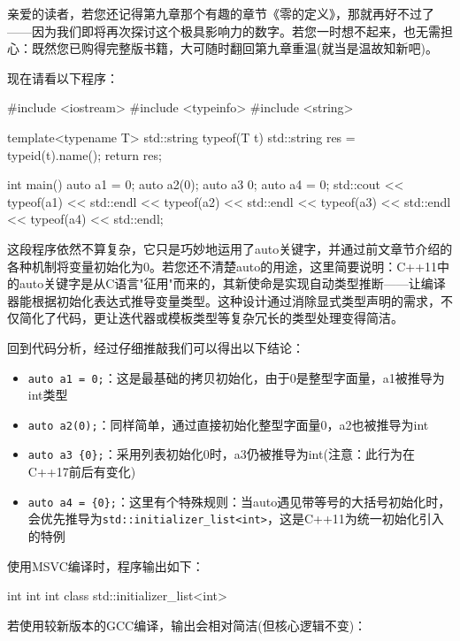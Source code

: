 
亲爱的读者，若您还记得第九章那个有趣的章节《零的定义》，那就再好不过了——因为我们即将再次探讨这个极具影响力的数字。若您一时想不起来，也无需担心：既然您已购得完整版书籍，大可随时翻回第九章重温(就当是温故知新吧)。

现在请看以下程序：

\begin{cpp}
#include <iostream>
#include <typeinfo>
#include <string>

template<typename T> std::string typeof(T t) {
  std::string res = typeid(t).name();
  return res;
}

int main() {
  auto a1 = 0;
  auto a2(0);
  auto a3 {0};
  auto a4 = {0};
  std::cout << typeof(a1) << std::endl
            << typeof(a2) << std::endl
            << typeof(a3) << std::endl
            << typeof(a4) << std::endl;
}
\end{cpp}

这段程序依然不算复杂，它只是巧妙地运用了auto关键字，并通过前文章节介绍的各种机制将变量初始化为0。若您还不清楚auto的用途，这里简要说明：C++11中的auto关键字是从C语言"征用"而来的，其新使命是实现自动类型推断——让编译器能根据初始化表达式推导变量类型。这种设计通过消除显式类型声明的需求，不仅简化了代码，更让迭代器或模板类型等复杂冗长的类型处理变得简洁。

回到代码分析，经过仔细推敲我们可以得出以下结论：

\begin{itemize}
\item 
\verb|auto a1 = 0;|：这是最基础的拷贝初始化，由于0是整型字面量，a1被推导为int类型

\item 
\verb|auto a2(0);|：同样简单，通过直接初始化整型字面量0，a2也被推导为int

\item 
\verb|auto a3 {0};|：采用列表初始化{0}时，a3仍被推导为int(注意：此行为在C++17前后有变化)

\item 
\verb|auto a4 = {0};|：这里有个特殊规则：当auto遇见带等号的大括号初始化时，会优先推导为\verb|std::initializer_list<int>|，这是C++11为统一初始化引入的特例
\end{itemize}

使用MSVC编译时，程序输出如下：

\begin{shell}
int
int
int
class std::initializer_list<int>
\end{shell}

若使用较新版本的GCC编译，输出会相对简洁(但核心逻辑不变)：

